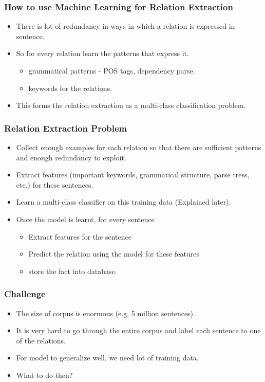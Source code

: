 \documentclass{beamer}
\begin{document}
\begin{frame}
\frametitle{How to use Machine Learning for Relation Extraction}
\begin{itemize}
  \item There is lot of redundancy in ways in which a relation is expressed in sentence. \pause
  \item So for every relation learn the patterns that express it. \pause
    \begin{itemize}
      \item grammatical patterns - POS tags, dependency parse. \pause
      \item keywords for the relations. \pause
    \end{itemize}
    
    \item This forms the relation extraction as a multi-class classification problem.
 \end{itemize}
\end{frame}


\begin{frame}
 \frametitle{Relation Extraction Problem}
 
  \begin{itemize}
   \item Collect enough examples for each relation so that there are sufficient patterns and enough redundancy to exploit.
   \item Extract features (important keywords, grammatical structure, parse tress, etc.) for these sentences.
   \item Learn a multi-class classifier on this training data (Explained later).
   \item Once the model is learnt, for every sentence 
    \begin{itemize}
	\item Extract features for the sentence
	\item Predict the relation using the model for these features
	\item store the fact into database.
     \end{itemize}
  \end{itemize}

 
\end{frame}

\begin{frame}
 
 \frametitle{Challenge}
 \begin{itemize}
  \item The size of corpus is enormous (e.g, 5 million sentences).  \pause
  \item It is very hard to go through the entire corpus and label each sentence to one of the relations. \pause
  \item For model to generalize well, we need lot of training data. \pause
  \item What to do then?
 \end{itemize}

 
\end{frame}
\end{document}
